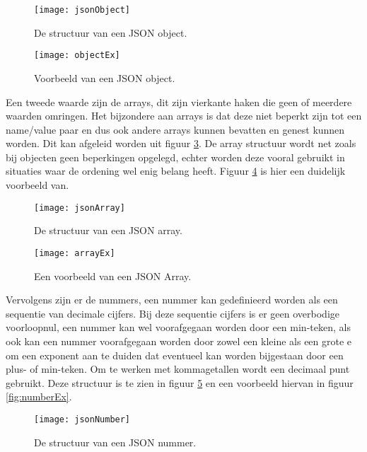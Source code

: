 \begin{figure}[H]
    \centering
\texttt{[image: jsonObject]}
\caption[JSON Object Structuur]{De structuur van een JSON object. \autocite{Crockford}}
    \label{fig:jsonObject}
\end{figure}

\begin{figure}[H]
    \centering
    \texttt{[image: objectEx]}
    \caption[JSON Object]{Voorbeeld van een JSON object.}
    \label{fig:objectEx}
\end{figure}

Een tweede waarde zijn de arrays, dit zijn vierkante haken die geen of meerdere waarden omringen. Het bijzondere aan arrays is dat deze niet beperkt zijn tot een name/value paar en dus ook andere arrays kunnen bevatten en genest kunnen worden. Dit kan afgeleid worden uit figuur \ref{fig:jsonArray}. De array structuur wordt net zoals bij objecten geen beperkingen opgelegd, echter worden deze vooral gebruikt in situaties waar de ordening wel enig belang heeft. Figuur \ref{fig:arrayEx} is hier een duidelijk voorbeeld van.

\begin{figure}[H]
    \centering
    \texttt{[image: jsonArray]}
    \caption[JSON Array Structuur]{De structuur van een JSON array.\autocite{Crockford}}
    \label{fig:jsonArray}
\end{figure}
\begin{figure}[H]
    \centering
    \texttt{[image: arrayEx]}
    \caption[JSON Array]{Een voorbeeld van een JSON Array.}
    \label{fig:arrayEx}
\end{figure}

Vervolgens zijn er de nummers, een nummer kan gedefinieerd worden als een sequentie van decimale cijfers. Bij deze sequentie cijfers is er geen overbodige voorloopnul, een nummer kan wel voorafgegaan worden door een min-teken, als ook kan een nummer voorafgegaan worden door zowel een kleine als een grote e om een exponent aan te duiden dat  eventueel kan worden bijgestaan door een plus- of min-teken. Om te werken met kommagetallen wordt een decimaal punt gebruikt. Deze structuur is te zien in figuur \ref{fig:jsonNumber} en een voorbeeld hiervan in figuur \ref{fig:numberEx}.

\begin{figure}[H]
    \centering
    \texttt{[image: jsonNumber]}
    \caption[JSON Nummer Structuur]{De structuur van een JSON nummer. \autocite{Crockford}}
    \label{fig:jsonNumber}
\end{figure}

